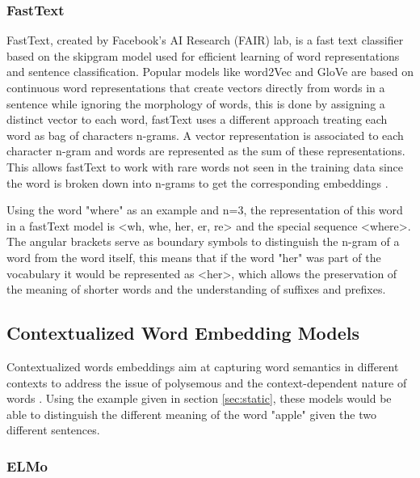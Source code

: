         \subsubsection{FastText}

        \par FastText, created by Facebook's AI Research (FAIR) lab, is a fast text classifier based on the skipgram model  used for efficient learning of word representations and sentence classification. Popular models like word2Vec and GloVe  are based on continuous word representations that create vectors directly from words in a sentence while ignoring the morphology of words, this is done by assigning a distinct vector to each word, fastText uses a different approach treating each word as bag of characters n-grams. A vector representation is associated to each character n-gram and words are represented as the sum of these representations. This allows fastText to work with rare words not seen in the training data since the word is broken down into n-grams to get the corresponding embeddings \cite{bojanowski2016enriching}.


        \par Using the word "where" as an example and n=3, the representation of this word in a fastText model is <wh, whe, her, er, re> and the special sequence <where>. The angular brackets serve as boundary symbols to distinguish the n-gram of a word from the word itself, this means that if the word "her" was part of the vocabulary it would be represented as <her>, which allows the preservation of the meaning of shorter words and the understanding of suffixes and prefixes.

        

       


  
    
    \subsection{Contextualized Word Embedding Models}
        
        \par Contextualized words embeddings aim at capturing word semantics in different contexts to address the issue of polysemous and the context-dependent nature of words \cite{Batista2018}. Using the example given in  section \ref{sec:static}, these models would be able to distinguish the different meaning of the word "apple" given the two different sentences.


        \subsubsection{ELMo}

